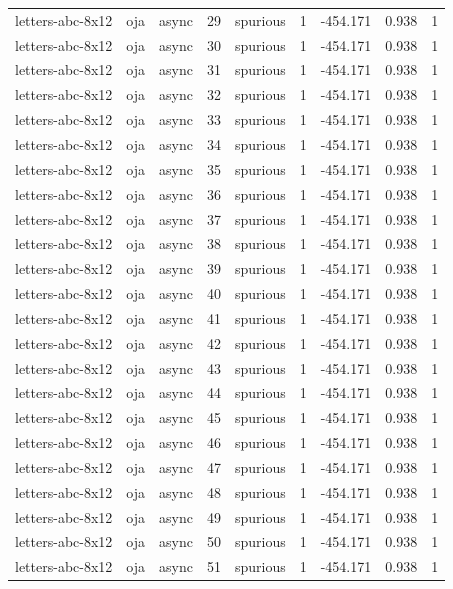 \begin{tabular}{lllrlrrrr}
letters-abc-8x12 & oja & async & 29 & spurious & 1 & -454.171 & 0.938 & 1 \\
letters-abc-8x12 & oja & async & 30 & spurious & 1 & -454.171 & 0.938 & 1 \\
letters-abc-8x12 & oja & async & 31 & spurious & 1 & -454.171 & 0.938 & 1 \\
letters-abc-8x12 & oja & async & 32 & spurious & 1 & -454.171 & 0.938 & 1 \\
letters-abc-8x12 & oja & async & 33 & spurious & 1 & -454.171 & 0.938 & 1 \\
letters-abc-8x12 & oja & async & 34 & spurious & 1 & -454.171 & 0.938 & 1 \\
letters-abc-8x12 & oja & async & 35 & spurious & 1 & -454.171 & 0.938 & 1 \\
letters-abc-8x12 & oja & async & 36 & spurious & 1 & -454.171 & 0.938 & 1 \\
letters-abc-8x12 & oja & async & 37 & spurious & 1 & -454.171 & 0.938 & 1 \\
letters-abc-8x12 & oja & async & 38 & spurious & 1 & -454.171 & 0.938 & 1 \\
letters-abc-8x12 & oja & async & 39 & spurious & 1 & -454.171 & 0.938 & 1 \\
letters-abc-8x12 & oja & async & 40 & spurious & 1 & -454.171 & 0.938 & 1 \\
letters-abc-8x12 & oja & async & 41 & spurious & 1 & -454.171 & 0.938 & 1 \\
letters-abc-8x12 & oja & async & 42 & spurious & 1 & -454.171 & 0.938 & 1 \\
letters-abc-8x12 & oja & async & 43 & spurious & 1 & -454.171 & 0.938 & 1 \\
letters-abc-8x12 & oja & async & 44 & spurious & 1 & -454.171 & 0.938 & 1 \\
letters-abc-8x12 & oja & async & 45 & spurious & 1 & -454.171 & 0.938 & 1 \\
letters-abc-8x12 & oja & async & 46 & spurious & 1 & -454.171 & 0.938 & 1 \\
letters-abc-8x12 & oja & async & 47 & spurious & 1 & -454.171 & 0.938 & 1 \\
letters-abc-8x12 & oja & async & 48 & spurious & 1 & -454.171 & 0.938 & 1 \\
letters-abc-8x12 & oja & async & 49 & spurious & 1 & -454.171 & 0.938 & 1 \\
letters-abc-8x12 & oja & async & 50 & spurious & 1 & -454.171 & 0.938 & 1 \\
letters-abc-8x12 & oja & async & 51 & spurious & 1 & -454.171 & 0.938 & 1 \\

\end{tabular}
